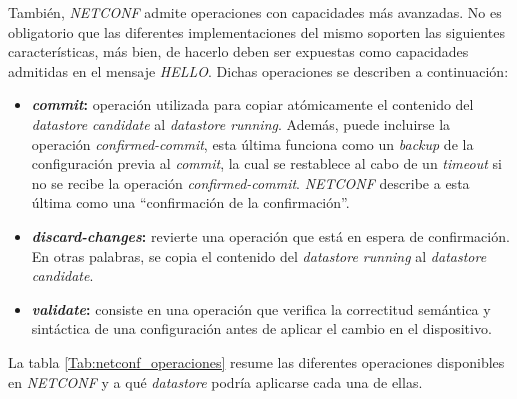 También, \textit{NETCONF} admite operaciones con capacidades más avanzadas. No es obligatorio que las diferentes implementaciones del mismo soporten las siguientes características, más bien, de hacerlo deben ser expuestas como capacidades admitidas en el mensaje \textit{HELLO}. Dichas operaciones se describen a continuación:
\begin{itemize}
	\item \textbf{\textit{commit}:} operación utilizada para copiar atómicamente el contenido del \textit{datastore candidate} al \textit{datastore running}. Además, puede incluirse la operación \textit{confirmed-commit}, esta última funciona como un \textit{backup} de la configuración previa al \textit{commit}, la cual se restablece al cabo de un \textit{timeout} si no se recibe la operación \textit{confirmed-commit}. \textit{NETCONF} describe a esta última como una “confirmación de la confirmación”.
	\item \textbf{\textit{discard-changes}:} revierte una operación que está en espera de confirmación. En otras palabras, se copia el contenido del \textit{datastore running} al \textit{datastore candidate}.
	\item \textbf{\textit{validate}:} consiste en una operación que verifica la correctitud semántica y sintáctica de una configuración antes de aplicar el cambio en el dispositivo. 
\end{itemize}


La tabla \ref{Tab:netconf_operaciones} resume las diferentes operaciones disponibles en \textit{NETCONF} y a qué \textit{datastore} podría aplicarse cada una de ellas. 
\\

